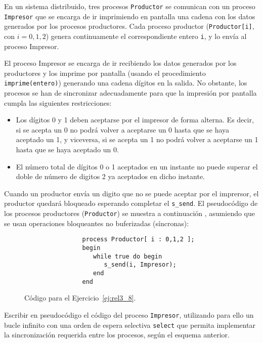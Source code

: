 \begin{ejercicio}\label{ej:rel3_8}
    En un sistema distribuido, tres procesos \verb|Productor| se comunican con un proceso \verb|Impresor| que se encarga de ir imprimiendo en pantalla una cadena con los datos generados por los procesos productores. Cada proceso productor (\verb|Productor[i]|, con $i=0,1,2$) genera continuamente el correspondiente entero \verb|i|, y lo envía al proceso Impresor.

    El proceso Impresor se encarga de ir recibiendo los datos generados por los productores y los imprime por pantalla (usando el procedimiento \verb|imprime(entero)|) generando una cadena dígitos en la salida. No obstante, los procesos se han de sincronizar adecuadamente para que la impresión por pantalla cumpla las siguientes restricciones:
    \begin{itemize}
        \item Los dígitos 0 y 1 deben aceptarse por el impresor de forma alterna. Es decir, si se acepta un 0 no podrá volver a aceptarse un 0 hasta que se haya aceptado un 1, y viceversa, si se acepta un 1 no podrá volver a aceptarse un 1 hasta que se haya aceptado un 0.
        \item El número total de dígitos 0 o 1 aceptados en un instante no puede superar el doble de número de digitos 2 ya aceptados en dicho instante.
    \end{itemize}
    Cuando un productor envía un digito que no se puede aceptar por el imprersor, el productor quedará bloqueado esperando completar el \verb|s_send|. El pseudocódigo de los procesos productores (\verb|Productor|) se muestra a continuación , asumiendo que se usan operaciones bloqueantes no buferizadas (síncronas):
    \begin{figure}[H]
        \centering
            \begin{verbatim}
                process Productor[ i : 0,1,2 ];
                begin
                   while true do begin
                      s_send(i, Impresor);
                   end
                end
            \end{verbatim}
        \caption{Código para el Ejercicio~\ref{ej:rel3_8}.}
        \label{fig:cod_8}
    \end{figure}
    Escribir en pseudocódigo el código del proceso \verb|Impresor|, utilizando para ello un bucle infinito con una orden de espera selectiva \verb|select| que permita implementar la sincronización requerida entre los procesos, según el esquema anterior.\\


\end{ejercicio}
